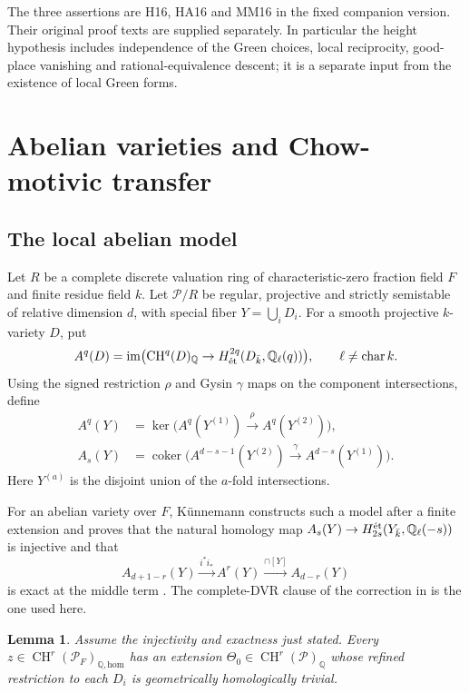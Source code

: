 \documentclass[11pt,a4paper]{article}
\newtheorem{lemma}[theorem]{Lemma}
\theoremstyle{definition}
\theoremstyle{remark}\newtheorem{remark}[theorem]{Remark}
\numberwithin{equation}{section}
\newcommand{\Q}{\mathbb Q}\newcommand{\R}{\mathbb R}\newcommand{\C}{\mathbb C}
\newcommand{\CH}{\operatorname{CH}}\newcommand{\an}{\mathrm{an}}
\newcommand{\homol}{\mathrm{hom}}\newcommand{\BC}{\mathrm{BC}}
\begin{document}
The three assertions are H16, HA16 and MM16 in the fixed companion version.
Their original proof texts are supplied separately. In particular the
height hypothesis includes independence of the Green choices, local
reciprocity, good-place vanishing and rational-equivalence descent;
it is a separate input from the existence of local Green forms.

\section{Abelian varieties and Chow-motivic transfer}\label{sec:transfer}

\subsection{The local abelian model}

Let $R$ be a complete discrete valuation ring of characteristic-zero
fraction field $F$ and finite residue field $k$. Let $\mathcal P/R$ be
regular, projective and strictly semistable of relative dimension $d$,
with special fiber $Y=\bigcup_iD_i$. For a smooth projective
$k$-variety $D$, put
\[
 A^q(D)=\operatorname{im}\bigl(\CH^q(D)_\Q\to
 H^{2q}_{\textnormal{ét}}(D_{\bar k},\Q_\ell(q))\bigr),
 \qquad \ell\ne\operatorname{char}k.
\]
Using the signed restriction $\rho$ and Gysin $\gamma$ maps on the
component intersections, define
\begin{align*}
 A^q(Y)&=\ker\bigl(A^q(Y^{(1)})\xrightarrow{\rho}A^q(Y^{(2)})\bigr),\\
 A_s(Y)&=\operatorname{coker}\bigl(
 A^{d-s-1}(Y^{(2)})\xrightarrow{\gamma}A^{d-s}(Y^{(1)})\bigr).
\end{align*}
Here $Y^{(a)}$ is the disjoint union of the $a$-fold intersections.

For an abelian variety over $F$, K\"unnemann constructs such a model
after a finite extension and proves that the natural homology map
$A_s(Y)\to H^{\textnormal{ét}}_{2s}(Y_{\bar k},\Q_\ell(-s))$
is injective and that
\begin{equation}\label{eq:kun-complex}
 A_{d+1-r}(Y)\xrightarrow{i^*i_*}A^r(Y)
                  \xrightarrow{\cap[Y]}A_{d-r}(Y)
\end{equation}
is exact at the middle term \cite[Theorems 5.6 and 6.6]{Kun}.
The complete-DVR clause of the correction in \cite[\S5.8]{Kun}
is the one used here.

\begin{lemma}\label{lem:model-correction}
Assume the injectivity and exactness just stated. Every
$z\in\CH^r(\mathcal P_F)_{\Q,\homol}$ has an extension
$\Theta_0\in\CH^r(\mathcal P)_\Q$ whose refined restriction to
each $D_i$ is geometrically homologically trivial.
\end{lemma}
\end{document}
